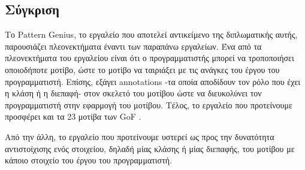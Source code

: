 \subsection{Σύγκριση}
\label{subsec:compare}
Το Pattern Genius, το εργαλείο που αποτελεί αντικείμενο 
της διπλωματικής αυτής, παρουσιάζει πλεονεκτήματα έναντι των παραπάνω εργαλείων.
Ένα από τα πλεονεκτήματα του εργαλείου είναι ότι ο προγραμματιστής μπορεί να τροποποιήσει οποιοδήποτε μοτίβο, 
ώστε το μοτίβο να ταιριάξει με τις ανάγκες του έργου του προγραμματιστή. 
Επίσης, εξάγει annotations -τα οποία αποδίδουν τον ρόλο που έχει η κλάση ή η διεπαφή-  
στον σκελετό του μοτίβου ώστε να διευκολύνει τον προγραμματιστή 
στην εφαρμογή του μοτίβου. 
Τέλος, το εργαλείο που προτείνουμε προσφέρει και τα 23 μοτίβα των GoF \cite{GoF}.
\par
Από την άλλη, το εργαλείο που προτείνουμε υστερεί ως προς την δυνατότητα 
αντιστοίχισης ενός στοιχείου, δηλαδή μίας κλάσης ή μίας διεπαφής, του μοτίβου με κάποιο στοιχείο 
του έργου του προγραμματιστή. 
